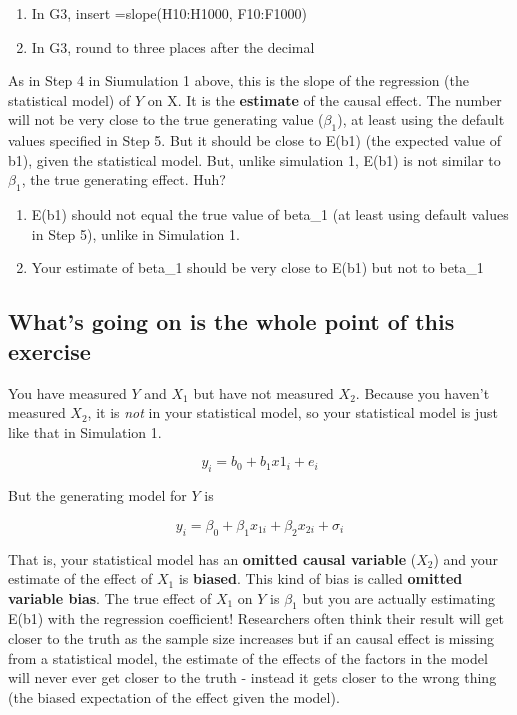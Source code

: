 \documentclass[]{book}
\providecommand{\tightlist}{%
  \setlength{\itemsep}{0pt}\setlength{\parskip}{0pt}}
\begin{document}
\begin{enumerate}
\def\labelenumi{\arabic{enumi}.}
\tightlist
\item
  In G3, insert =slope(H10:H1000, F10:F1000)
\item
  In G3, round to three places after the decimal
\end{enumerate}

As in Step 4 in Siumulation 1 above, this is the slope of the regression
(the statistical model) of \(Y\) on X. It is the \textbf{estimate} of
the causal effect. The number will not be very close to the true
generating value (\(\beta_1\)), at least using the default values
specified in Step 5. But it should be close to E(b1) (the expected value
of b1), given the statistical model. But, unlike simulation 1, E(b1) is
not similar to \(\beta_1\), the true generating effect. Huh?

\begin{enumerate}
\def\labelenumi{\arabic{enumi}.}
\tightlist
\item
  E(b1) should not equal the true value of beta\_1 (at least using
  default values in Step 5), unlike in Simulation 1.
\item
  Your estimate of beta\_1 should be very close to E(b1) but not to
  beta\_1
\end{enumerate}

\subsection{What's going on is the whole point of this
exercise}\label{whats-going-on-is-the-whole-point-of-this-exercise}

You have measured \(Y\) and \(X_1\) but have not measured \(X_2\).
Because you haven't measured \(X_2\), it is \emph{not} in your
statistical model, so your statistical model is just like that in
Simulation 1.

\begin{equation}
y_i = b_0 + b_1 x1_i + e_i
\end{equation}

But the generating model for \(Y\) is

\begin{equation}
y_i = \beta_0 + \beta_1 x_{1i} + \beta_2 x_{2i} + \sigma_i
\end{equation}

That is, your statistical model has an \textbf{omitted causal variable}
(\(X_2\)) and your estimate of the effect of \(X_1\) is \textbf{biased}.
This kind of bias is called \textbf{omitted variable bias}. The true
effect of \(X_1\) on \(Y\) is \(\beta_1\) but you are actually
estimating E(b1) with the regression coefficient! Researchers often
think their result will get closer to the truth as the sample size
increases but if an causal effect is missing from a statistical model,
the estimate of the effects of the factors in the model will never ever
get closer to the truth - instead it gets closer to the wrong thing (the
biased expectation of the effect given the model).
\end{document}
